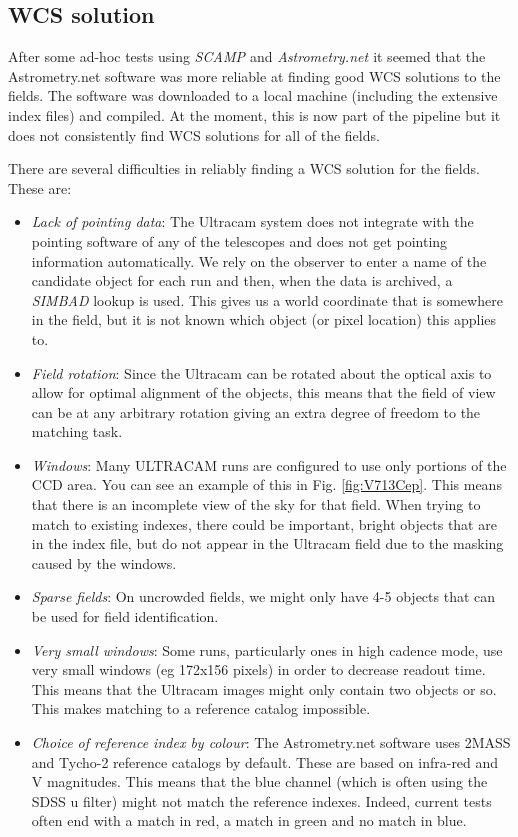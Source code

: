 \documentclass[a4paper,10pt]{article}
\begin{document}
\subsection{WCS solution}
After some ad-hoc tests using \emph{SCAMP \cite{scamp}} and \emph{Astrometry.net \cite{astrometry}} it seemed that the Astrometry.net software was more reliable at finding good WCS solutions to the fields. The software was downloaded to a local machine (including the extensive index files) and compiled. At the moment, this is now part of the pipeline but it does not consistently find WCS solutions for all of the fields. 

There are several difficulties in reliably finding a WCS solution for the fields.  These are:
\begin{itemize}
	\item \emph{Lack of pointing data}: The Ultracam system does not integrate with the pointing software of any of the telescopes and does not get pointing information automatically. We rely on the observer to enter a name of the candidate object for each run and then, when the data is archived, a \emph{SIMBAD} lookup is used. This gives us a world coordinate that is somewhere in the field, but it is not known which object (or pixel location) this applies to.  
	\item \emph{Field rotation}: Since the Ultracam can be rotated about the optical axis to allow for optimal alignment of the objects, this means that the field of view can be at any arbitrary rotation giving an extra degree of freedom to the matching task. 
	\item \emph{Windows}: Many ULTRACAM runs are configured to use only portions of the CCD area. You can see an example of this in Fig.  \ref{fig:V713Cep}. This means that there is an incomplete view of the sky for that field. When trying to match to existing indexes, there could be important, bright objects that are in the index file, but do not appear in the Ultracam field due to the masking caused by the windows.
	\item \emph{Sparse fields}: On uncrowded fields, we might only have 4-5 objects that can be used for field identification. 
	\item \emph{Very small windows}: Some runs, particularly ones in high cadence mode, use very small windows (eg 172x156 pixels) in order to decrease readout time. This means that the Ultracam images might only contain two objects or so. This makes matching to a reference catalog impossible. 
	\item \emph{Choice of reference index by colour}: The Astrometry.net software uses 2MASS and Tycho-2 reference catalogs by default. These are based on infra-red and V magnitudes. This means that the blue channel (which is often using the SDSS u filter) might not match the reference indexes. Indeed, current tests often end with a match in red, a match in green and no match in blue. 
\end{itemize}
\end{document}
